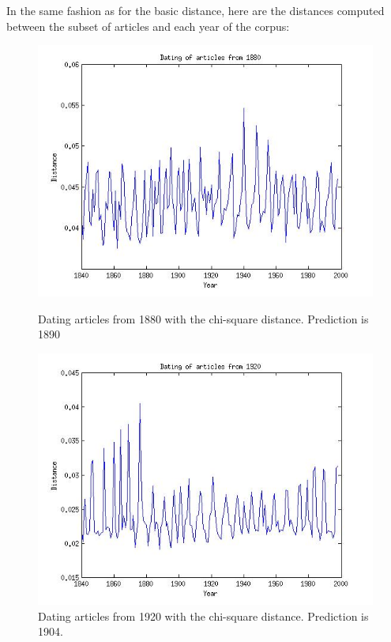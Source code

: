 In the same fashion as for the basic distance, here are the distances computed between the subset of articles and each year of the corpus:
\begin{figure}[H]
    \begin{minipage}[b]{0.3\linewidth}
        \includegraphics[scale=0.25]{Pictures/date_articles/chi2/dating1880.jpg}
        \caption{Dating articles from 1880 with the chi-square distance. Prediction is 1890}
    \end{minipage}\hfill
    \begin{minipage}[b]{0.3\linewidth}
        \includegraphics[scale=0.25]{Pictures/date_articles/chi2/dating1920.jpg}
        \caption{Dating articles from 1920 with the chi-square distance. Prediction is 1904.}

\end{minipage}
\end{figure}
